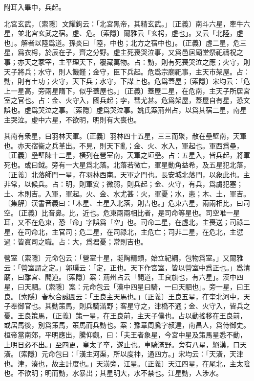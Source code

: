 附耳入畢中，兵起。

北宮玄武，〔索隱〕文耀鉤云：「北宮黑帝，其精玄武。」〔正義〕南斗六星，牽牛六星，並北宮玄武之宿。虛、危。〔索隱〕爾雅云「玄枵，虛也」。又云「北陸，虛也」。解者以陸爲道。孫炎曰「陸，中也；北方之宿中也」。〔正義〕虛二星，危三星，爲衣枵，於辰在子，齊之分野。虛主死喪哭泣事，又爲邑居廟堂祭祀禱祝之事；亦天之冢宰，主平理天下，覆藏萬物。占：動，則有死喪哭泣之應；火守，則天子將兵；水守，則人饑饉；金守，臣下兵起。危爲宗廟祀事，主天市架屋。占：動，則有土功；火守，天下兵；水守，下謀上也。危爲蓋屋；〔索隱〕宋均云：「危上一星高，旁兩星隋下，似乎蓋屋也。」〔正義〕蓋屋二星，在危南，主天子所居宮室之官也。占：金、火守入，國兵起；孛，彗尤甚。危爲架屋，蓋屋自有星，恐文誤也。虛爲哭泣之事。〔索隱〕虛爲哭泣事。姚氏案荊州占，以爲其宿二星，南星主哭泣。虛中六星，不欲明，明則有大喪也。

其南有衆星，曰羽林天軍。〔正義〕羽林四十五星，三三而聚，散在壘壁南，天軍也。亦天宿衞之兵革出。不見，則天下亂；金、火、水入，軍起也。軍西爲壘，〔正義〕壘壁陳十二星，橫列在營室南，天軍之垣壘。占：五星入，皆兵起，將軍死也。或曰鉞。旁有一大星爲北落。北落若微亡，軍星動角益希，及五星犯北落，〔正義〕北落師門一星，在羽林西南。天軍之門也。長安城北落門，以象此也。主非常，以候兵。占：明，則軍安；微弱，則兵起；金、火守，有兵，爲虜犯塞；土、木則吉。入軍，軍起。火、金、水尤甚：火，軍憂；水，患；木、土，軍吉。〔集解〕漢書音義曰：「木星、土星入北落，則吉也。」危東六星，兩兩相比，曰司空。〔正義〕比音鼻。比，近也。危東兩兩相比者，是司命等星也。司空唯一星耳，又不在危東，恐「命」字誤爲「空」也。司命二星，在虛北，主喪送；司祿二星，在司命北，主官司；危二星，在司祿北，主危亡；司非二星，在危北，主愆過：皆寘司之職。占：大，爲君憂；常則吉也。

營室〔索隱〕元命包云：「營室十星，埏陶精類，始立紀綱，包物爲室。」又爾雅云：「營室謂之定。」郭璞云：「定，正也。天下作宮室，皆以營室中爲正也。」爲清廟，曰離宮、閣道。〔索隱〕案：荊州占云「閣道，王良旗也，有六星」。漢中四星，曰天駟。〔索隱〕案：元命包云「漢中四星曰騎，一曰天駟也」。旁一星，曰王良。〔索隱〕春秋合誠圖云：「王良主天馬也。」〔正義〕王良五星，在奎北河中，天子奉御官也。其動策馬，則兵騎滿野；客星守之，津橋不通；金、火守入，皆兵之憂。王良策馬，〔正義〕策一星，在王良前，主天子僕也。占以動搖移在王良前，或居馬後，別爲策馬，策馬而兵動也。案：豫章周騰字叔達，南昌人，爲侍御史。桓帝當南郊，平明應出，騰仰觀，曰：「夫王者象星，今宮中星及策馬星悉不動，上明日必不出。」至四更，皇太子卒，遂止也。車騎滿野。旁有八星，絕漢，曰天潢。〔索隱〕元命包曰：「潢主河渠，所以度神，通四方。」宋均云：「天潢，天津也。津，湊也，故主計度也。」天潢旁，江星。〔正義〕天江四星，在尾北，主太陰也。不欲明；明而動，水暴出；其星明大，水不禁也。江星動，人涉水。

